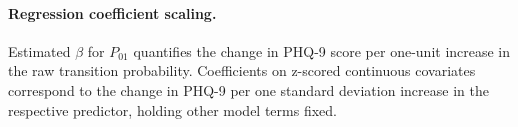 \paragraph{Regression coefficient scaling.}
Estimated $\beta$ for $P_{01}$ quantifies the change in PHQ-9 score per one-unit increase in the raw transition probability.
Coefficients on z-scored continuous covariates correspond to the change in PHQ-9 per one standard deviation increase in the respective predictor, holding other model terms fixed.
